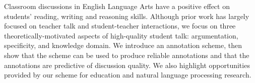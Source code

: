 Classroom discussions in English Language Arts have a positive effect on students' reading, writing and reasoning skills. Although prior work has largely focused on teacher talk and student-teacher interactions, we focus on three theoretically-motivated aspects of high-quality student talk: argumentation, specificity, and knowledge domain. We introduce an annotation scheme, then show that the scheme can be used to produce reliable annotations and that the annotations are predictive of discussion quality. We also highlight opportunities provided by our scheme for education and natural language processing research.
